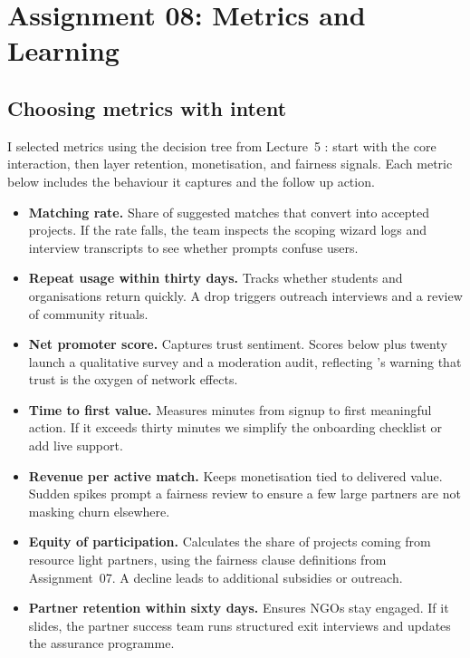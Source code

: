 \section*{Assignment 08: Metrics and Learning}

\subsection*{Choosing metrics with intent}
I selected metrics using the decision tree from Lecture~5 \citep{Lecture05}: start with the core interaction, then layer retention, monetisation, and fairness signals. Each metric below includes the behaviour it captures and the follow up action.
\begin{itemize}
    \item \textbf{Matching rate.} Share of suggested matches that convert into accepted projects. If the rate falls, the team inspects the scoping wizard logs and interview transcripts to see whether prompts confuse users.
    \item \textbf{Repeat usage within thirty days.} Tracks whether students and organisations return quickly. A drop triggers outreach interviews and a review of community rituals.
    \item \textbf{Net promoter score.} Captures trust sentiment. Scores below plus twenty launch a qualitative survey and a moderation audit, reflecting \citet{Choudary2016}'s warning that trust is the oxygen of network effects.
    \item \textbf{Time to first value.} Measures minutes from signup to first meaningful action. If it exceeds thirty minutes we simplify the onboarding checklist or add live support.
    \item \textbf{Revenue per active match.} Keeps monetisation tied to delivered value. Sudden spikes prompt a fairness review to ensure a few large partners are not masking churn elsewhere.
    \item \textbf{Equity of participation.} Calculates the share of projects coming from resource light partners, using the fairness clause definitions from Assignment~07. A decline leads to additional subsidies or outreach.
    \item \textbf{Partner retention within sixty days.} Ensures NGOs stay engaged. If it slides, the partner success team runs structured exit interviews and updates the assurance programme.
\end{itemize}

